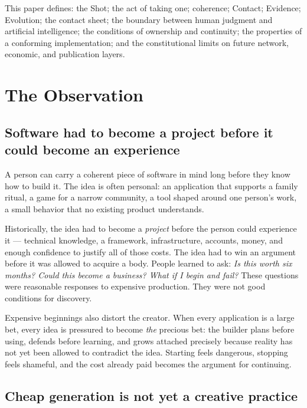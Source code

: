 \documentclass[11pt]{article}
\begin{document}
This paper defines: the Shot; the act of taking one; coherence; Contact;
Evidence; Evolution; the contact sheet; the boundary between human
judgment and artificial intelligence; the conditions of ownership and
continuity; the properties of a conforming implementation; and the
constitutional limits on future network, economic, and publication
layers.

\section{The Observation}

\subsection{Software had to become a project before it could become an
experience}

A person can carry a coherent piece of software in mind long before they
know how to build it. The idea is often personal: an application that
supports a family ritual, a game for a narrow community, a tool shaped
around one person's work, a small behavior that no existing product
understands.

Historically, the idea had to become a \emph{project} before the person
could experience it --- technical knowledge, a framework, infrastructure,
accounts, money, and enough confidence to justify all of those costs.
The idea had to win an argument before it was allowed to acquire a body.
People learned to ask: \emph{Is this worth six months? Could this become
a business? What if I begin and fail?} These questions were reasonable
responses to expensive production. They were not good conditions for
discovery.

Expensive beginnings also distort the creator. When every application is
a large bet, every idea is pressured to become \emph{the} precious bet:
the builder plans before using, defends before learning, and grows
attached precisely because reality has not yet been allowed to
contradict the idea. Starting feels dangerous, stopping feels shameful,
and the cost already paid becomes the argument for continuing.

\subsection{Cheap generation is not yet a creative practice}
\end{document}
